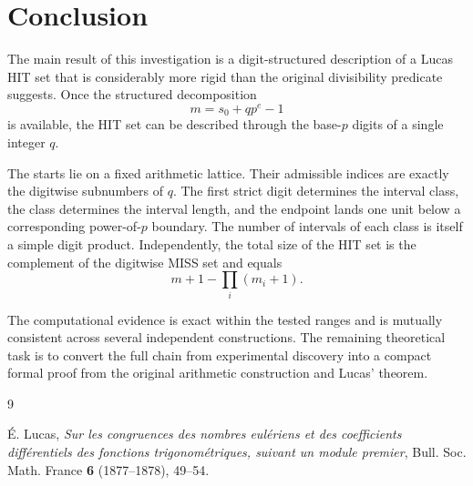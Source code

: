 \documentclass[11pt,a4paper]{article}
\theoremstyle{definition}
\theoremstyle{remark}
\begin{document}
\section{Conclusion}

The main result of this investigation is a digit-structured description of a Lucas HIT set that is considerably more rigid than the original divisibility predicate suggests.  Once the structured decomposition
\[
 m=s_0+qp^e-1
\]
is available, the HIT set can be described through the base-$p$ digits of a single integer $q$.

The starts lie on a fixed arithmetic lattice.  Their admissible indices are exactly the digitwise subnumbers of $q$.  The first strict digit determines the interval class, the class determines the interval length, and the endpoint lands one unit below a corresponding power-of-$p$ boundary.  The number of intervals of each class is itself a simple digit product.  Independently, the total size of the HIT set is the complement of the digitwise MISS set and equals
\[
 m+1-\prod_i(m_i+1).
\]

The computational evidence is exact within the tested ranges and is mutually consistent across several independent constructions.  The remaining theoretical task is to convert the full chain from experimental discovery into a compact formal proof from the original arithmetic construction and Lucas' theorem.

\begin{thebibliography}{9}

É. Lucas,
\emph{Sur les congruences des nombres eulériens et des coefficients différentiels des fonctions trigonométriques, suivant un module premier},
Bull. Soc. Math. France \textbf{6} (1877--1878), 49--54.

\end{thebibliography}
\end{document}
